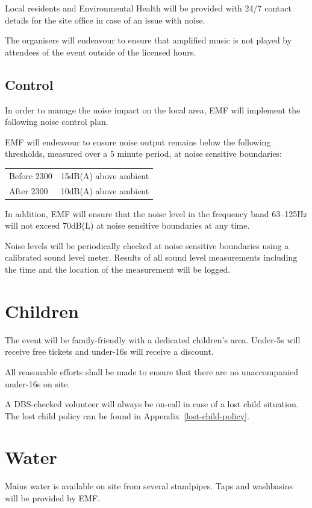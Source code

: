 Local residents and Environmental Health will be provided with 24/7 contact details for the site office
in case of an issue with noise.

The organisers will endeavour to ensure that amplified music is not played by attendees of the event
outside of the licensed hours.

\subsection{Control}

In order to manage the noise impact on the local area, EMF will implement the following noise control plan.

EMF will endeavour to ensure noise output remains below the following thresholds, measured over a 5 minute
period, at noise sensitive boundaries:

\begin{tabular}{l l}
  Before 2300 & 15dB(A) above ambient\\
  After 2300 & 10dB(A) above ambient\\
\end{tabular}

In addition, EMF will ensure that the noise level in the frequency band 63--125Hz will not exceed 70dB(L)
at noise sensitive boundaries at any time.

Noise levels will be periodically checked at noise sensitive boundaries using a calibrated sound level meter.
Results of all sound level measurements including the time and the location of the measurement will be logged.

\section{Children}

The event will be family-friendly with a dedicated children's area. Under-5s will receive free tickets
and under-16s will receive a discount.

All reasonable efforts shall be made to ensure that there are no unaccompanied under-16s on site.

A DBS-checked volunteer will always be on-call in case of a lost child situation. The lost child
policy can be found in Appendix~\ref{lost-child-policy}.

\section{Water}
Mains water is available on site from several standpipes. Taps and washbasins will be provided by EMF.

